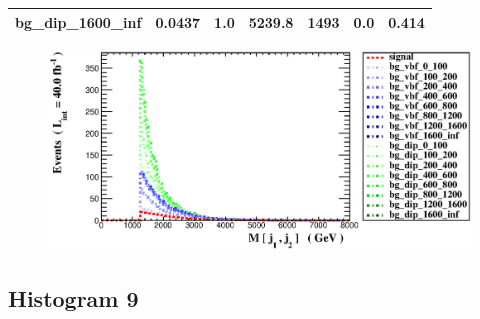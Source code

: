 \documentclass[a4paper, 10pt]{article}
\begin{document}
\begin{table}[H]
\begin{center}
\begin{tabular}{|m{23.0mm}|m{23.0mm}|m{18.0mm}|m{19.0mm}|m{19.0mm}|m{19.0mm}|m{19.0mm}|}
      \hline
      {\cellcolor{white}         bg\_dip\_1600\_inf}& {\cellcolor{white}         0.0437}& {\cellcolor{white}         1.0}& {\cellcolor{white}         5239.8}& {\cellcolor{white}         1493}& {\cellcolor{green}         0.0}& {\cellcolor{green}         0.414}\\
\hline
    \end{tabular}
  \end{center}
\end{table}

\begin{figure}[H]
  \begin{center}
    \includegraphics[scale=0.45]{selection_7.eps}\\
\caption{   }
  \end{center}
\end{figure}
      \newpage
\subsection{ Histogram 9}
\end{document}
